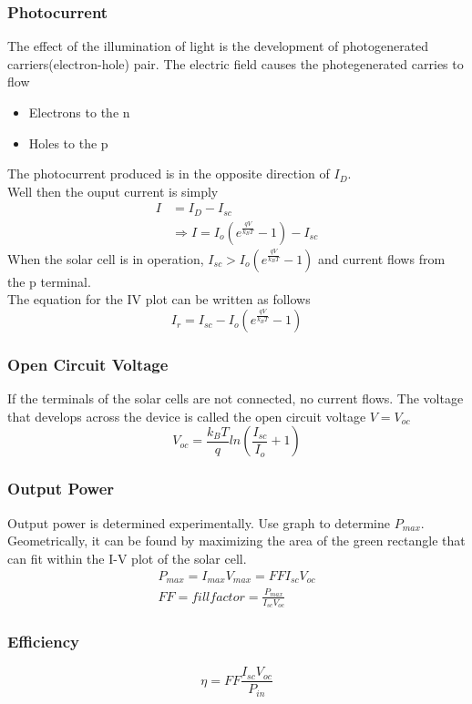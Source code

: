 \documentclass{article}
\begin{document}
\subsubsection{Photocurrent}
The effect of the illumination of light is the development of photogenerated
carriers(electron-hole) pair. The electric field causes the photegenerated
carries to flow
\begin{itemize}
	\item Electrons to the n
	\item Holes to the p
\end{itemize}
The photocurrent produced is in the opposite direction of $I_{D}$. \\
Well then the ouput current is simply
\begin{align}
	I & = I_{D} - I_{sc}                                        \\
	  & \Rightarrow I = I_{o}(e^{\frac{qV}{k_{B}T}}-1) - I_{sc}
\end{align}
When the solar cell is in operation, $I_{sc} > I_{o}(e^{\frac{qV}{k_{B}T}}-1)$
and current flows from the p terminal. \\
The equation for the IV plot can be written as follows
\begin{equation}
	I_{r} = I_{sc} - I_{o}(e^{\frac{qV}{k_{B}T}}-1)
\end{equation}
\subsubsection{Open Circuit Voltage}
If the terminals of the solar cells are not connected, no current flows.
The voltage that develops across the device is called the open circuit
voltage $V = V_{oc}$
\begin{equation}
	V_{oc} = \frac{k_{B}T}{q}ln(\frac{I_{sc}}{I_o}+1)
\end{equation}
\subsubsection{Output Power}
Output power is determined experimentally. Use graph to determine
$P_{max}$. Geometrically, it can be found by maximizing the area of the
green rectangle that can fit within the I-V plot of the solar cell.
\begin{gather}
	P_{max} = I_{max} V_{max} = FF I_{sc}V_{oc} \\
	FF = fill factor = \frac{P_{max}}{I_{sc}V_{oc}}
\end{gather}
\subsubsection{Efficiency}
\begin{equation}
	\eta = FF \frac{I_{sc}V_{oc}}{P_{in}}
\end{equation}
\end{document}
